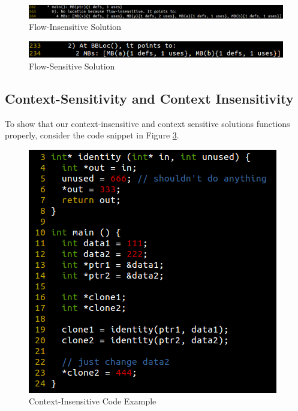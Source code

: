 \begin{figure}
\begin{center}
\leavevmode
\includegraphics[scale=0.5]{images/fi_log.png}
\end{center}
\caption{Flow-Insensitive Solution}
\label{fig:fi-log}
\end{figure}

\begin{figure}
\begin{center}
\leavevmode
\includegraphics[scale=0.5]{images/fs_log.png}
\end{center}
\caption{Flow-Sensitive Solution}
\label{fig:fs-log}
\end{figure}

\subsection{Context-Sensitivity and Context Insensitivity}
To show that our context-insensitive and context sensitive solutions functions
properly, consider the code snippet in Figure \ref{fig:ci-code}.

\begin{figure}
\begin{center}
\leavevmode
\includegraphics[scale=0.5]{images/ci_code.png}
\end{center}
\caption{Context-Insensitive Code Example}
\label{fig:ci-code}
\end{figure}

